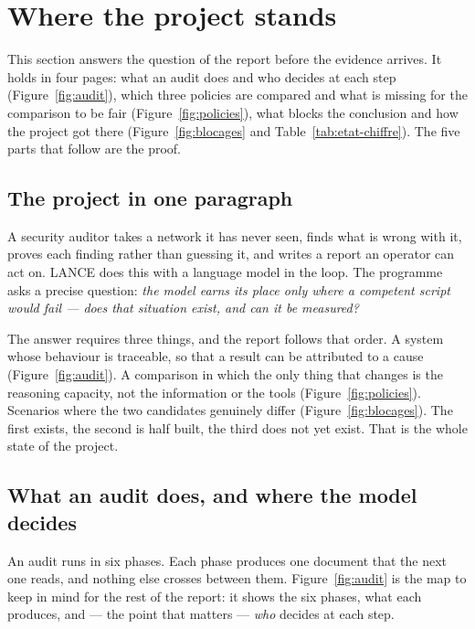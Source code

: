 \section{Where the project stands}
\label{sec:etat}

This section answers the question of the report before the evidence arrives. It
holds in four pages: what an audit does and who decides at each step
(Figure~\ref{fig:audit}), which three policies are compared and what is missing for
the comparison to be fair (Figure~\ref{fig:policies}), what blocks the conclusion
and how the project got there (Figure~\ref{fig:blocages} and
Table~\ref{tab:etat-chiffre}). The five parts that follow are the proof.

\subsection{The project in one paragraph}

A security auditor takes a network it has never seen, finds what is wrong with it,
proves each finding rather than guessing it, and writes a report an operator can
act on. LANCE does this with a language model in the loop. The programme asks a
precise question: \emph{the model earns its place only where a competent script
would fail --- does that situation exist, and can it be measured?}

The answer requires three things, and the report follows that order. A system
whose behaviour is traceable, so that a result can be attributed to a cause
(Figure~\ref{fig:audit}). A comparison in which the only thing that changes is the
reasoning capacity, not the information or the tools
(Figure~\ref{fig:policies}). Scenarios where the two candidates genuinely differ
(Figure~\ref{fig:blocages}). The first exists, the second is half built, the third
does not yet exist. That is the whole state of the project.

\subsection{What an audit does, and where the model decides}
\label{sec:parcours}

An audit runs in six phases. Each phase produces one document that the next one
reads, and nothing else crosses between them. Figure~\ref{fig:audit} is the map to
keep in mind for the rest of the report: it shows the six phases, what each
produces, and --- the point that matters --- \emph{who} decides at each step.

